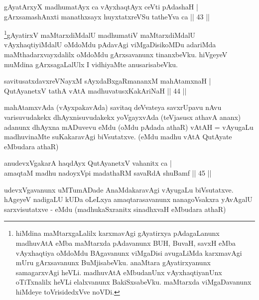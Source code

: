 
\begin{shl}
gAyatArxyX madhumatAyx ca vAyxhaqtAyx ceVti pAdashaH | \\
gArxsamashAnxti manathxsayx huyxtatxreVSu tatheYva ca \hfill|| 43 || 
\end{shl}

\begin{artha}
\footnote[1]{hiMdina maMtarxgaLalilx karxmavAgi gAyatirxya 
pAdagaLanunx madhuvAtA eMba maMtarxda pAdavanunx BUH, BuvaH, savxH 
eMba vAyxhaqtiya oMdoMdu BAgavanunx viMgaDisi avugaLiMda karxmavAgi 
mUru gArxsavanunx BuMjisabeVku. anaMtara gAyatirxyanunx samagarxvAgi 
heVLi. madhuvAtA eMbudanUnx vAyxhaqtiyanUnx oTiTxnalilx heVLi 
elalxvanunx BakiSxsabeVku. maMtarxda viMgaDavanunx hiMdeye 
toVrisidedxVve noVDi.}gAyatirxV maMtarxdiMdalU madhumatiV maMtarxdiMdalU 
vAyxhaqtiyiMdalU oMdoMdu pAdavAgi viMgaDisikoMDu adariMda 
maMthadarxvayxdalilx oMdoMdu gArxsavanunx tinanxbeVku. hiVgeyeV muMdina 
gArxsagaLalUlx I vidhiyaMte anusarisabeVku.
\end{artha}


\begin{shl}
savitusatxdavxreVNayxM sAyxdaBxgaRmananxM mahAtamxnaH | \\
QutAyanetxV tathA vAtA madhuvatusxKakAriNaH \hfill|| 44 || 
\end{shl}

\begin{artha}
mahAtamxvAda (vAyxpakavAda) savitaq deVvateya savxrUpavu nAvu 
varisuvudakekx dhAyxnisuvudakekx yoVgayxvAda (teVjasusx athavA ananx) 
adanunx dhAyxna mADuvevu eMdu (oMdu pAdada athaR) vAtAH = vAyugaLu 
madhuvinaMte suKakaravAgi biVsutatxve. (eMdu madhu vAtA QutAyate 
eMbudara athaR)
\end{artha}


\begin{shl}
anudevxVgakarA haqdAyx QutAyanetxV vahanitx ca | \\
amaqtaM madhu nadoyxV\s pi madathaRM savaRdA shuBamf \hfill|| 45 || 
\end{shl}

\begin{artha}
udevxVgavanunx uMTumADade AnaMdakaravAgi vAyugaLu biVsutatxve. hAgeyeV 
nadigaLU kUDa oLeLxya amaqtarasavanunx nanagoVsakxra yAvAgalU 
sarxvisutatxve - eMdu (madhukaSxranitx sinadhxvaH eMbudara athaR)
\end{artha}

